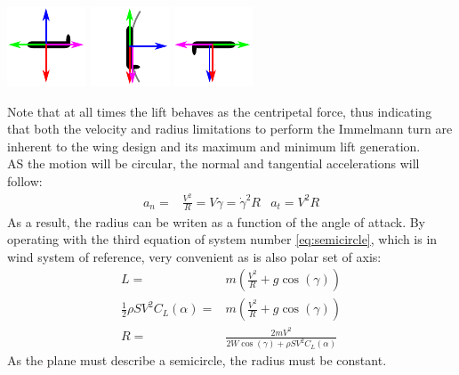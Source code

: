 	\includegraphics[width=0.3\linewidth]{figures/free-body-1.pdf} \hfill
	\label{fig:free-body-1}
		\includegraphics[width=0.3\linewidth]{figures/free-body-2.pdf}\hfill
	\label{fig:free-body-2}
		\includegraphics[width=0.3\linewidth]{figures/free-body-3.pdf}
	\label{fig:free-body-3}
	\vspace{0.5cm}
	\vspace{0.25cm}
		\label{fig:3avions}

Note that at all times the lift behaves as the centripetal force, thus indicating that both the velocity and radius limitations to perform the Immelmann turn are inherent to the wing design and its maximum and minimum lift generation.\\
AS the motion will be circular, the normal and tangential accelerations will follow:
\begin{align*}
	a_n=&\frac{V^2}{R}=V\dot{\gamma}=\dot{\gamma}^2R&a_t=V^2R
\end{align*}
As a result, the radius can be writen as a function of the angle of attack. By operating with the third equation of system number \ref{eq:semicircle}, which is in wind system of reference, very convenient as is also polar set of axis:
\begin{align*}
	L=&m\left(\frac{V^2}{R}+g\cos(\gamma)\right)\\
	\frac{1}{2}\rho S V^2 C_L(\alpha)=&m\left(\frac{V^2}{R}+g\cos(\gamma)\right)\\
	R=&\frac{2mV^2}{2W\cos(\gamma)+\rho S V^2 C_L(\alpha)}
\end{align*}
As the plane must describe a semicircle, the radius must be constant.

